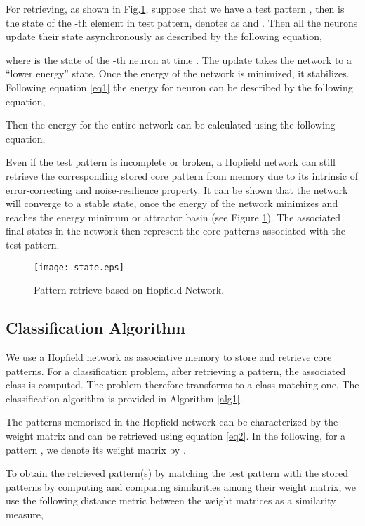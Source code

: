 \documentclass[conference]{IEEEtran}
\begin{document}
For retrieving, as shown in Fig.\ref{fig:state}, suppose  that we have a test pattern ,  
then  is the state of the -th element in test pattern, denotes as  and .
Then all the neurons  update their state asynchronously as described by the following equation,

where  is the state of the -th neuron at time . The update takes the network  to a ``lower energy'' state.   Once the energy of the network is minimized, it stabilizes. Following  equation \eqref{eq1} the energy  for neuron  can be described by the following equation,


Then the energy for the entire network \cite{sabahi2017hopfield} can be calculated using  the following equation,


Even  if the test pattern is incomplete or broken, a Hopfield network can still retrieve the corresponding stored  core pattern  from  memory due to its intrinsic of error-correcting and noise-resilience property. It can be shown that the network will converge to a stable state, once the energy of the network  minimizes and reaches the energy minimum or attractor basin (see Figure \ref{fig:state}). The associated final states in the network then represent the core patterns associated with  the test pattern. 

\begin{figure}[t!]
    \centering
    \texttt{[image: state.eps]}
    \caption{Pattern retrieve based on Hopfield Network.}
    \label{fig:state}
\end{figure}

\subsection{Classification Algorithm}\label{pf}
We use a  Hopfield network as associative memory to store and retrieve core patterns. For a classification problem, after  retrieving  a pattern, the associated class is computed. The problem therefore transforms to a class matching one.  The classification algorithm is provided in Algorithm  \ref{alg1}. \par

The patterns memorized in the Hopfield network can be characterized by  the weight matrix \cite{ladwani2017hopfield} and can be retrieved using equation  \eqref{eq2}. In the following, for a pattern , we denote its weight matrix by . 




To obtain the retrieved pattern(s) by matching the test pattern with the stored patterns by  computing and comparing similarities among their weight matrix, we use the following  distance metric between the weight matrices as a similarity measure,
\end{document}
